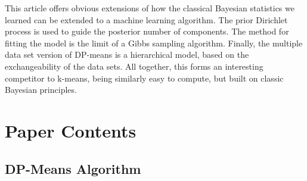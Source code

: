 \documentclass[11pt]{article}
\theoremstyle{definition}
\begin{document}
This article offers obvious extensions of how the classical Bayesian statistics we learned can be extended to a machine learning algorithm. The prior Dirichlet process is used to guide the posterior number of components. The method for fitting the model is the limit of a Gibbs sampling algorithm. Finally, the multiple data set version of DP-means is a hierarchical model, based on the exchangeability of the data sets. All together, this forms an interesting competitor to k-means, being similarly easy to compute, but built on classic Bayesian principles.

\section{Paper Contents}
\subsection{DP-Means Algorithm}
\end{document}
